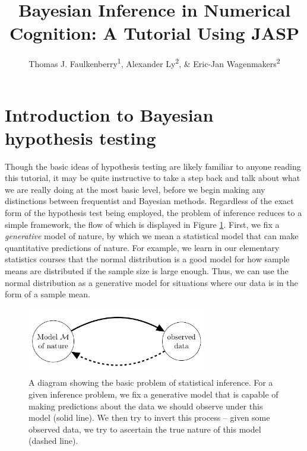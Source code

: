 \documentclass[english,,doc,floatsintext]{apa6}
\title{Bayesian Inference in Numerical Cognition: A Tutorial Using JASP}
\author{Thomas J. Faulkenberry\textsuperscript{1}, Alexander Ly\textsuperscript{2}, \& Eric-Jan Wagenmakers\textsuperscript{2}}
\date{}
\affiliation{
\vspace{0.5cm}
\textsuperscript{1} Tarleton State University\\\textsuperscript{2} University of Amsterdam}
\begin{document}
\maketitle

\hypertarget{introduction-to-bayesian-hypothesis-testing}{%
\section{Introduction to Bayesian hypothesis testing}\label{introduction-to-bayesian-hypothesis-testing}}

Though the basic ideas of hypothesis testing are likely familiar to anyone reading this tutorial, it may be quite instructive to take a step back and talk about what we are really doing at the most basic level, before we begin making any distinctions between frequentist and Bayesian methods. Regardless of the exact form of the hypothesis test being employed, the problem of inference reduces to a simple framework, the flow of which is displayed in Figure \ref{fig:genModel}. First, we fix a \emph{generative} model of nature, by which we mean a statistical model that can make quantitative predictions of nature. For example, we learn in our elementary statistics courses that the normal distribution is a good model for how sample means are distributed if the sample size is large enough. Thus, we can use the normal distribution as a generative model for situations where our data is in the form of a sample mean.

\begin{figure}
\centering
\includegraphics[width=0.7\textwidth,height=\textheight]{figures/genModel.pdf}
\caption{\label{fig:genModel}A diagram showing the basic problem of statistical inference. For a given inference problem, we fix a generative model that is capable of making predictions about the data we should observe under this model (solid line). We then try to invert this process -- given some observed data, we try to ascertain the true nature of this model (dashed line).}
\end{figure}
\end{document}
